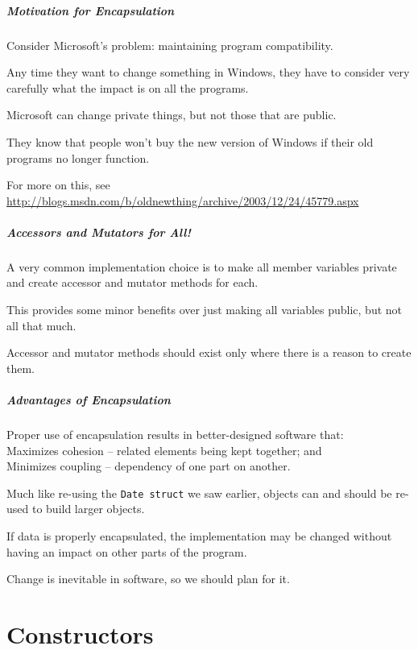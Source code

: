 \begin{frame}
\frametitle{Motivation for Encapsulation}
Consider Microsoft's problem: maintaining program compatibility.

Any time they want to change something in Windows, they have to consider very carefully what the impact is on all the programs.

Microsoft can change private things, but not those that are public.

They know that people won't buy the new version of Windows if their old programs no longer function.

For more on this, see \url{http://blogs.msdn.com/b/oldnewthing/archive/2003/12/24/45779.aspx}
\end{frame}

\begin{frame}
\frametitle{Accessors and Mutators for All!}
A very common implementation choice is to make all member variables private and create accessor and mutator methods for each.

This provides some minor benefits over just making all variables public, but not all that much.

Accessor and mutator methods should exist only where there is a reason to create them.

\end{frame}


\begin{frame}
\frametitle{Advantages of Encapsulation}
Proper use of encapsulation results in better-designed software that:\\
\quad Maximizes \alert{cohesion} -- related elements being kept together; and\\
\quad Minimizes \alert{coupling} -- dependency of one part on another.

Much like re-using the \texttt{Date struct} we saw earlier, objects can and should be re-used to build larger objects.

If data is properly encapsulated, the implementation may be changed without having an impact on other parts of the program.

Change is inevitable in software, so we should plan for it.

\end{frame}

\part{Constructors}
\begin{frame}\partpage\end{frame}

